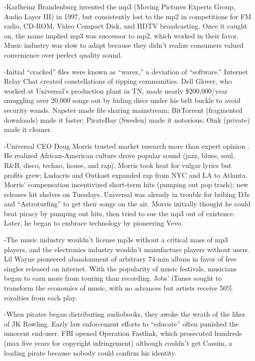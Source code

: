 \documentclass[
]{article}
\begin{document}
-Karlheinz Brandenburg invented the mp3 (Moving Pictures Experts Group,
Audio Layer III) in 1997, but consistently lost to the mp2 in
competitions for FM radio, CD-ROM, Video Compact Disk, and HDTV
broadcasting. Once it caught on, the name implied mp3 was successor to
mp2, which worked in their favor. Music industry was slow to adapt
because they didn't realize consumers valued convenience over perfect
quality sound.

-Initial ``cracked'' files were known as ``warez,'' a deviation of
``software.'' Internet Relay Chat created constellations of ripping
communities. Dell Glover, who worked at Universal's production plant in
TN, made nearly \$200,000/year smuggling over 20,000 songs out by hiding
discs under his belt buckle to avoid security wands. Napster made file
sharing mainstream; BitTorrent (fragmented downloads) made it faster;
PirateBay (Sweden) made it notorious; Oink (private) made it cleaner.

-Universal CEO Doug Morris trusted market research more than expert
opinion . He realized African-American culture drove popular sound
(jazz, blues, soul, R\&B, disco, techno, house, and rap). Morris took
heat for vulgar lyrics but profits grew; Ludacris and Outkast expanded
rap from NYC and LA to Atlanta. Morris' compensation incentivized
short-term hits (pumping out pop trash); new releases hit shelves on
Tuesdays. Universal was already in trouble for bribing DJs and
``Astroturfing'' to get their songs on the air. Morris initially thought
he could beat piracy by pumping out hits, then tried to sue the mp3 out
of existence. Later, he began to embrace technology by pioneering Vevo.

-The music industry wouldn't license mp3s without a critical mass of mp3
players, and the electronics industry wouldn't manufacture players
without users. Lil Wayne pioneered abandonment of arbitrary 74-min album
in favor of free singles released on internet. With the popularity of
music festivals, musicians began to earn more from touring than
recording. Jobs' iTunes sought to transform the economics of music, with
no advances but artists receive 50\% royalties from each play.

-When pirates began distributing audiobooks, they awoke the wrath of the
likes of JK Rowling. Early law enforcement efforts to ``educate'' often
punished the innocent end-user. FBI opened Operation Fastlink, which
prosecuted hundreds (max five years for copyright infringement) although
couldn't get Cassim, a leading pirate because nobody could confirm his
identity.
\end{document}
